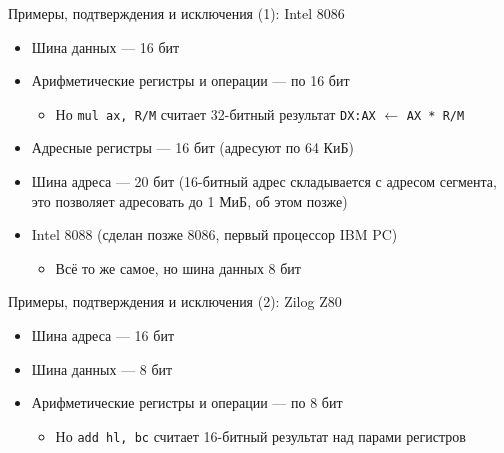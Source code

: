 \documentclass[xetex,aspectratio=43]{beamer}
\begin{document}
\begin{frame}{Примеры, подтверждения и исключения (1): Intel 8086}
\begin{itemize}
    \item
    Шина данных --- 16 бит
    \item
    Арифметические регистры и операции --- по 16 бит

    \begin{itemize}
        \item
        Но \texttt{mul ax, R/M} считает 32-битный результат
        \texttt{DX:AX} $\gets$ \texttt{AX * R/M}
    \end{itemize}
    \item
    Адресные регистры --- 16 бит (адресуют по 64 КиБ)
    \item
    Шина адреса --- 20 бит (16-битный адрес складывается с адресом
    сегмента, это позволяет адресовать до 1 МиБ, об этом позже)

    \pause
    \item
    Intel 8088 (сделан позже 8086, первый процессор IBM PC)

    \begin{itemize}
        \tightlist
        \item
        Всё то же самое, но шина данных 8 бит
    \end{itemize}
\end{itemize}

\end{frame}

\begin{frame}{Примеры, подтверждения и исключения (2): Zilog Z80}
\begin{itemize}
    \item
    Шина адреса --- 16 бит
    \item
    Шина данных --- 8 бит
    \item
    Арифметические регистры и операции --- по 8 бит

    \begin{itemize}
        \item
        Но \texttt{add hl, bc} считает 16-битный результат над парами
        регистров
    \end{itemize}
\end{itemize}
\end{frame}
\end{document}
